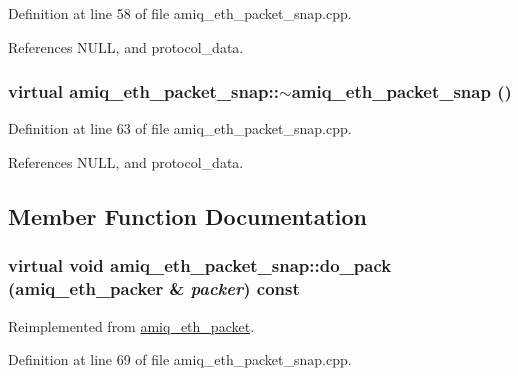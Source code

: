 Definition at line 58 of file amiq\_\-eth\_\-packet\_\-snap.cpp.

References NULL, and protocol\_\-data.\hypertarget{classamiq__eth__packet__snap_a4e5486a36616f6fda29c1248796704fb}{
\subsubsection[{$\sim$amiq\_\-eth\_\-packet\_\-snap}]{\setlength{\rightskip}{0pt plus 5cm}virtual amiq\_\-eth\_\-packet\_\-snap::$\sim$amiq\_\-eth\_\-packet\_\-snap ()}}
\label{classamiq__eth__packet__snap_a4e5486a36616f6fda29c1248796704fb}


Definition at line 63 of file amiq\_\-eth\_\-packet\_\-snap.cpp.

References NULL, and protocol\_\-data.

\subsection{Member Function Documentation}
\hypertarget{classamiq__eth__packet__snap_ace29c0c126f983a5e88ff933f1b34ff6}{
\subsubsection[{do\_\-pack}]{\setlength{\rightskip}{0pt plus 5cm}virtual void amiq\_\-eth\_\-packet\_\-snap::do\_\-pack ({\bf amiq\_\-eth\_\-packer} \& {\em packer}) const}}
\label{classamiq__eth__packet__snap_ace29c0c126f983a5e88ff933f1b34ff6}


Reimplemented from \hyperlink{classamiq__eth__packet_ab580d89fb44208f5a0fe31443619473e}{amiq\_\-eth\_\-packet}.

Definition at line 69 of file amiq\_\-eth\_\-packet\_\-snap.cpp.

